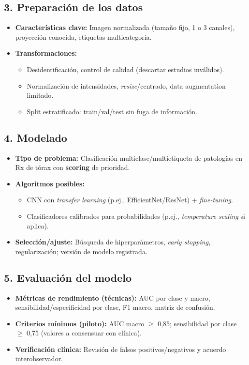 \documentclass[
11pt, %
]{charter}
\begin{document}
\subsection*{3. Preparación de los datos}
\begin{itemize}
  \item \textbf{Características clave:} Imagen normalizada (tamaño fijo, 1 o 3 canales), proyección conocida, etiquetas multicategoría.
  \item \textbf{Transformaciones:} 
    \begin{itemize}
      \item Desidentificación, control de calidad (descartar estudios inválidos).
      \item Normalización de intensidades, \textit{resize}/centrado, data augmentation limitado.
      \item Split estratificado: train/val/test sin fuga de información.
    \end{itemize}
\end{itemize}

\subsection*{4. Modelado}
\begin{itemize}
  \item \textbf{Tipo de problema:} Clasificación multiclase/multietiqueta de patologías en Rx de tórax con \textbf{scoring} de prioridad.
  \item \textbf{Algoritmos posibles:} 
    \begin{itemize}
      \item CNN con \textit{transfer learning} (p.ej., EfficientNet/ResNet) + \textit{fine-tuning}.
      \item Clasificadores calibrados para probabilidades (p.ej., \textit{temperature scaling} si aplica).
    \end{itemize}
  \item \textbf{Selección/ajuste:} Búsqueda de hiperparámetros, \textit{early stopping}, regularización; versión de modelo registrada.
\end{itemize}

\subsection*{5. Evaluación del modelo}
\begin{itemize}
  \item \textbf{Métricas de rendimiento (técnicas):} AUC por clase y macro, sensibilidad/especificidad por clase, F1 macro, matriz de confusión.
  \item \textbf{Criterios mínimos (piloto):} AUC macro \(\geq\) 0,85; sensibilidad por clase \(\geq\) 0,75 (valores a consensuar con clínica).
  \item \textbf{Verificación clínica:} Revisión de falsos positivos/negativos y acuerdo interobservador.
\end{itemize}
\end{document}
